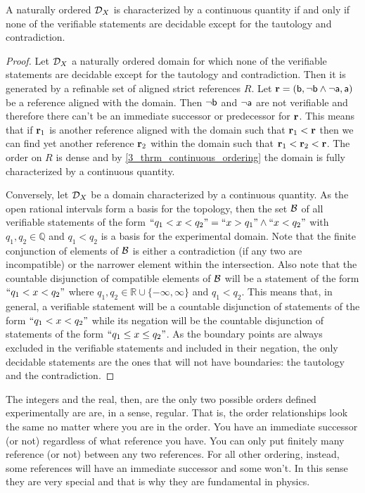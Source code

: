 \documentclass[11pt,letterpaper,fleqn]{memoir} %
\begin{document}
\begin{mathSection}
\begin{prop}
	A naturally ordered $\edomain_X$ is characterized by a continuous quantity if and only if none of the verifiable statements are decidable except for the tautology and contradiction.
\end{prop}
\begin{proof}
	Let $\edomain_X$ a naturally ordered domain for which none of the verifiable statements are decidable except for the tautology and contradiction. Then it is generated by a refinable set of aligned strict references $R$. Let $\refStmt=(\stmt[b], \NOT \stmt[b] \AND \NOT \stmt[a], \stmt[a])$ be a reference aligned with the domain. Then $\NOT\stmt[b]$ and $\NOT\stmt[a]$ are not verifiable and therefore there can't be an immediate successor or predecessor for $\refStmt$. This means that if $\refStmt_1$ is another reference aligned with the domain such that $\refStmt_1 < \refStmt$ then we can find yet another reference $\refStmt_2$ within the domain such that $\refStmt_1 < \refStmt_2 < \refStmt$. The order on $R$ is dense and by \ref{3_thrm_continuous_ordering} the domain is fully characterized by a continuous quantity.
	
	Conversely, let $\edomain_X$ be a domain characterized by a continuous quantity. As the open rational intervals form a basis for the topology, then the set $\basis$ of all verifiable statements of the form $``q_1 < x < q_2" = ``x > q_1" \AND ``x < q_2"$ with $q_1, q_2 \in \mathbb{Q}$ and $q_1 < q_2$ is a basis for the experimental domain. Note that the finite conjunction of elements of $\basis$ is either a contradiction (if any two are incompatible) or the narrower element within the intersection. Also note that the countable disjunction of compatible elements of $\basis$ will be a statement of the form $``q_1 < x < q_2"$ where $q_1, q_2 \in \mathbb{R} \cup \{ -\infty, \infty \}$ and $q_1 < q_2$. This means that, in general, a verifiable statement will be a countable disjunction of statements of the form $``q_1 < x < q_2"$ while its negation will be the countable disjunction of statements of the form $``q_1 \leq x \leq q_2"$. As the boundary points are always excluded in the verifiable statements and included in their negation, the only decidable statements are the ones that will not have boundaries: the tautology and the contradiction.
\end{proof}
\end{mathSection}

The integers and the real, then, are the only two possible orders defined experimentally are are, in a sense, regular. That is, the order relationships look the same no matter where you are in the order. You have an immediate successor (or not) regardless of what reference you have. You can only put finitely many reference (or not) between any two references. For all other ordering, instead, some references will have an immediate successor and some won't. In this sense they are very special and that is why they are fundamental in physics.
\end{document}
